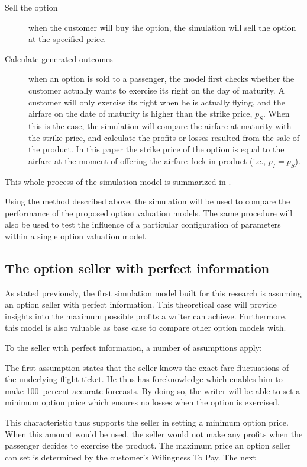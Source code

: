 \begin{description}
\item[Sell the option] when the customer will buy the option, the simulation will sell the option at the specified price.
\item[Calculate generated outcomes] when an option is sold to a passenger, the model first checks whether the customer actually wants to exercise its right on the day of maturity. A customer will only exercise its right when he is actually flying, and the airfare on the date of maturity is higher than the strike price, $p_S$. When this is the case, the simulation will compare the airfare at maturity with the strike price, and calculate the profits or losses resulted from the sale of the product. In this paper the strike price of the option is equal to the airfare at the moment of offering the airfare~lock-in product (i.e., $p_I = p_S$).
\end{description}

\noindent
This whole process of the simulation model is summarized in .


Using the method described above, the simulation will be used to compare the performance of the proposed option valuation models. The same procedure will also be used to test the influence of a particular configuration of parameters within a single option valuation model.


\subsection{The option seller with perfect information}
As stated previously, the first simulation model built for this research is assuming an option seller with perfect information. This theoretical case will provide insights into the maximum possible profits a writer can achieve. Furthermore, this model is also valuable as base case to compare other option models with.

To the seller with perfect information, a number of assumptions apply:

The first assumption states that the seller knows the exact fare fluctuations of the underlying flight ticket. He thus has foreknowledge which enables him to make 100~percent accurate forecasts. By doing so, the writer will be able to set a minimum option price which ensures no losses when the option is exercised.

This characteristic thus supports the seller in setting a minimum option price. When this amount would be used, the seller would not make any profits when the passenger decides to exercise the product. The maximum price an option seller can set is determined by the customer's Wilingness To Pay. The next 


